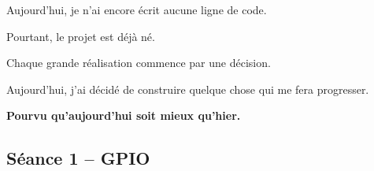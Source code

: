 \documentclass[11pt,a4paper]{article}
\begin{document}
	\begin{motivation}
		Aujourd'hui, je n'ai encore écrit aucune ligne de code.
		
		Pourtant, le projet est déjà né.
		
		Chaque grande réalisation commence par une décision.
		
		Aujourd'hui, j'ai décidé de construire quelque chose qui me fera progresser.
		
		\vspace{0.4cm}
		\centering
		\Large\textbf{Pourvu qu'aujourd'hui soit mieux qu'hier.}
	\end{motivation}
	
	\newpage
	
	\subsection*{Séance 1 -- GPIO}
	
\end{document}
